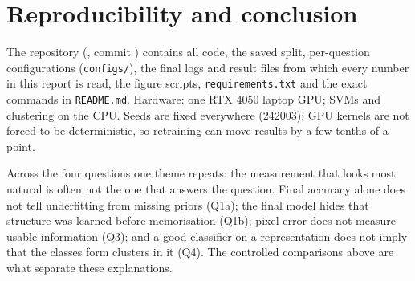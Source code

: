 \section{Reproducibility and conclusion}
\label{sec:repro}
The repository (\repourl, commit \shortcommit) contains all code, the saved split, per-question configurations
(\texttt{configs/}), the final logs and result files from which every number in this report is read, the figure scripts,
\texttt{requirements.txt} and the exact commands in \texttt{README.md}. Hardware: one RTX 4050 laptop GPU;
SVMs and clustering on the CPU. Seeds are fixed everywhere (242003); GPU kernels are not forced to be
deterministic, so retraining can move results by a few tenths of a point.

Across the four questions one theme repeats: the measurement that looks most natural is often not the one
that answers the question. Final accuracy alone does not tell underfitting from missing priors (Q1a); the final
model hides that structure was learned before memorisation (Q1b); pixel error does not measure usable
information (Q3); and a good classifier on a representation does not imply that the classes form clusters in it
(Q4). The controlled comparisons above are what separate these explanations.

